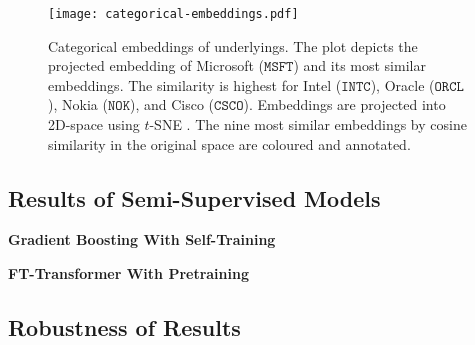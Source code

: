 \begin{figure}[ht]
    \centering
    \texttt{[image: categorical-embeddings.pdf]}
    \caption[Categorical Embeddings of Underlyings]{Categorical embeddings of underlyings. The plot depicts the projected embedding of Microsoft ($\mathtt{MSFT}$) and its most similar embeddings. The similarity is highest for Intel ($\mathtt{INTC}$), Oracle ($\mathtt{ORCL}$), Nokia ($\mathtt{NOK}$), and Cisco ($\mathtt{CSCO}$). Embeddings are projected into 2D-space using $t$-SNE \autocite{vandermaatenVisualizingDataUsing2008}. The nine most similar embeddings by cosine similarity in the original space are coloured and annotated.}
    \label{fig:categorical-embeddings}
\end{figure}


\subsection{Results of Semi-Supervised
    Models}\label{sec:results-of-semi-supervised-models}



\textbf{Gradient Boosting With Self-Training}

\textbf{FT-Transformer With Pretraining}

\subsection{Robustness of Results}\label{sec:robustness-checks}



